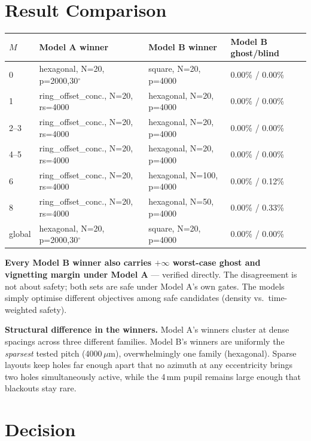 \section{Result Comparison}

\begin{center}
\begin{tabular}{llll}
\toprule
$M$ & Model A winner & Model B winner & Model B ghost/blind \\
\midrule
0 & hexagonal, N=20, p=2000,30$^\circ$ & square, N=20, p=4000 & 0.00\% / 0.00\% \\
1 & ring\_offset\_conc., N=20, rs=4000 & hexagonal, N=20, p=4000 & 0.00\% / 0.00\% \\
2--3 & ring\_offset\_conc., N=20, rs=4000 & hexagonal, N=20, p=4000 & 0.00\% / 0.00\% \\
4--5 & ring\_offset\_conc., N=20, rs=4000 & hexagonal, N=20, p=4000 & 0.00\% / 0.00\% \\
6 & ring\_offset\_conc., N=20, rs=4000 & hexagonal, N=100, p=4000 & 0.00\% / 0.12\% \\
8 & ring\_offset\_conc., N=20, rs=4000 & hexagonal, N=50, p=4000 & 0.00\% / 0.33\% \\
global & hexagonal, N=20, p=2000,30$^\circ$ & square, N=20, p=4000 & 0.00\% / 0.00\% \\
\bottomrule
\end{tabular}
\end{center}

\textbf{Every Model B winner also carries $+\infty$ worst-case ghost and
vignetting margin under Model A} --- verified directly. The disagreement
is not about safety; both sets are safe under Model A's own gates. The
models simply optimise different objectives among safe candidates
(density vs.\ time-weighted safety).

\textbf{Structural difference in the winners.} Model A's winners cluster
at dense spacings across three different families. Model B's winners are
uniformly the \emph{sparsest} tested pitch (4000\,$\mu$m), overwhelmingly
one family (hexagonal). Sparse layouts keep holes far enough apart that
no azimuth at any eccentricity brings two holes simultaneously active,
while the 4\,mm pupil remains large enough that blackouts stay rare.

\section{Decision}

